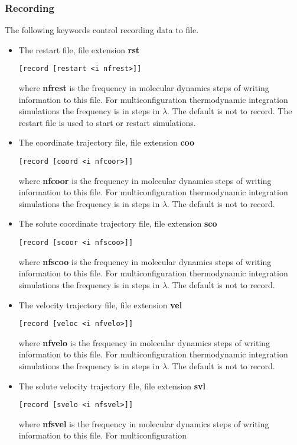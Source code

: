 \subsubsection{Recording}
The following keywords control recording data to file.
\begin{itemize}
\item
The restart file, file extension {\bf rst}
\begin{verbatim}
[record [restart <i nfrest>]]
\end{verbatim}
where {\bf nfrest} is the frequency in molecular dynamics steps
of writing information to this file. For multiconfiguration
thermodynamic integration simulations the frequency is in
steps in $\lambda$. The default is not to record. The restart
file is used to start or restart simulations.
\item
The coordinate trajectory file, file extension {\bf coo}
\begin{verbatim}
[record [coord <i nfcoor>]]
\end{verbatim}
where {\bf nfcoor} is the frequency in molecular dynamics steps
of writing information to this file. For multiconfiguration
thermodynamic integration simulations the frequency is in
steps in $\lambda$. The default is not to record.
\item
The solute coordinate trajectory file, file extension {\bf sco}
\begin{verbatim}
[record [scoor <i nfscoo>]]
\end{verbatim}
where {\bf nfscoo} is the frequency in molecular dynamics steps
of writing information to this file. For multiconfiguration
thermodynamic integration simulations the frequency is in
steps in $\lambda$. The default is not to record.
\item
The velocity trajectory file, file extension {\bf vel}
\begin{verbatim}
[record [veloc <i nfvelo>]]
\end{verbatim}
where {\bf nfvelo} is the frequency in molecular dynamics steps
of writing information to this file. For multiconfiguration
thermodynamic integration simulations the frequency is in
steps in $\lambda$. The default is not to record.
\item
The solute velocity trajectory file, file extension {\bf svl}
\begin{verbatim}
[record [svelo <i nfsvel>]]
\end{verbatim}
where {\bf nfsvel} is the frequency in molecular dynamics steps
of writing information to this file. For multiconfiguration

\end{itemize}

